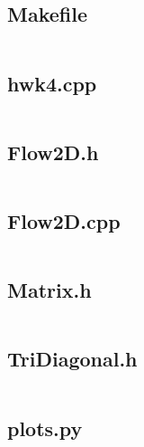 \documentclass{article}
\begin{document}
\subsection*{Makefile}
\inputminted[fontsize=\footnotesize]{Makefile}{../Makefile}

\subsection*{hwk4.cpp}
\inputminted[fontsize=\footnotesize]{c++}{../hwk4.cpp}

\subsection*{Flow2D.h}
\inputminted[fontsize=\footnotesize]{c++}{../Flow2D.h}

\subsection*{Flow2D.cpp}
\inputminted[fontsize=\footnotesize]{c++}{../Flow2D.cpp}

\subsection*{Matrix.h}
\inputminted[fontsize=\footnotesize]{c++}{../Matrix.h}

\subsection*{TriDiagonal.h}
\inputminted[fontsize=\footnotesize]{c++}{../TriDiagonal.h}

\subsection*{plots.py}
\end{document}
